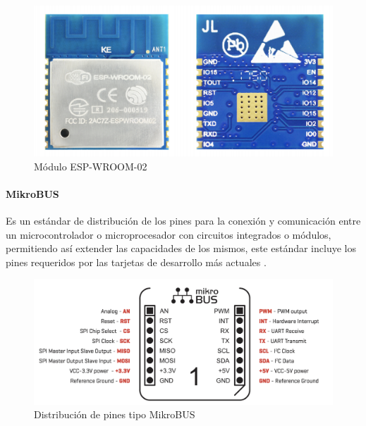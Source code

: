 \paragraph{}

\begin{figure}[H]
	\centering
	\includegraphics[scale=.25]{Capitulo2/images/wroom.png}
	\caption{Módulo ESP-WROOM-02}
	\label{fig:diagrama_dispensador}
\end{figure}


\paragraph{MikroBUS}
Es un estándar de distribución de los pines para la conexión y comunicación entre un microcontrolador o microprocesador con circuitos integrados o módulos, permitiendo así extender las capacidades de los mismos, este estándar incluye los pines requeridos por las tarjetas de desarrollo más actuales \citep{MarcoTeorico5}.
\begin{figure}[H]
	\centering
	\includegraphics[scale=.25]{Capitulo2/images/mikrobus.png}
	\caption{Distribución de pines tipo MikroBUS}
	\label{fig:diagrama_dispensador}
\end{figure}
\paragraph{}

